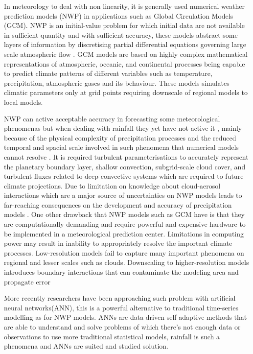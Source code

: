 In meteorology to deal with non linearity, it is generally used numerical weather prediction models (NWP) in applications such as Global Circulation Models (GCM). NWP is an initial-value problem for which initial data are not available in sufficient quantity and with sufficient accuracy, these models abstract some layers of information by discretising partial differential equations governing large scale atmospheric flow \cite{ghil1981applications}. GCM models are based on highly complex mathematical representations of atmospheric, oceanic, and continental processes being capable to predict climate patterns of different variables such as temperature, precipitation, atmospheric gases and its behaviour. These models simulates climatic parameters only at grid points requiring downscale of regional models to local models\cite{alotaibi2018future}. 

NWP can active acceptable accuracy in forecasting some meteorological phenomenas but when dealing with rainfall they yet have not active it \cite{ramirez2006linear}, mainly because of the physical complexity of precipitation processes and the reduced temporal and spacial scale involved in such phenomena that numerical models cannot resolve \cite{kuligowski1998localized}. It is required turbulent parameterisations to accurately represent the planetary boundary layer, shallow convection, subgrid-scale cloud cover, and turbulent fluxes related to deep convective systems which are required to future climate projections. Due to limitation on knowledge about cloud-aerosol interactions which are a major source of uncertainties on NWP models leads to far-reaching consequences on the development and accuracy of precipitation models \cite{prein2015review}. One other drawback that NWP models such as GCM have is that they are computationally demanding and require powerful and expensive hardware to be implemented in a meteorological prediction center.  Limitations in computing power may result in inability to appropriately resolve the important climate processes. Low-resolution models fail to capture many important phenomena on regional and lesser scales such as clouds. Downscaling to higher-resolution models introduces boundary interactions that can contaminate the modeling area and propagate error \cite{alotaibi2018future}

More recently researchers have been approaching such problem with artificial neural networks(ANN), this is a powerful alternative to traditional time-series modelling \cite{zhang1998linear} as for NWP models. ANNs are data-driven self adaptive methods that are able to understand and solve problems of which there's not enough data or observations to use more traditional statistical models\cite{zhang1998forecasting}, rainfall is such a phenomena and ANNs are suited and studied solution.

